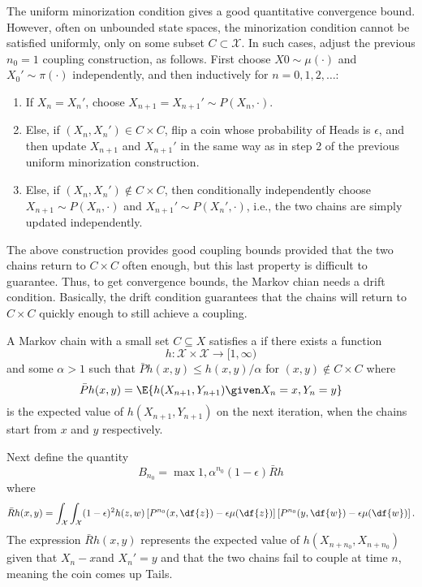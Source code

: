 \documentclass[12pt]{article}
\begin{document}
The uniform minorization condition gives a good quantitative convergence
bound.  However, often on unbounded state spaces, the minorization
condition cannot be satisfied uniformly, only on some subset \( C
\subset \mathcal{X} \).  In such cases, adjust the previous \( n_0 = 1 \)
coupling construction, as follows.  First choose \( X0 \sim \mu(\cdot) \)
and \( X_0' \sim \pi(\cdot) \) independently, and then inductively for \(
n = 0, 1, 2, \dots \):
\begin{enumerate}
    \item
        If \( X_n = X_n' \), choose \( X_{n+1} = X_{n+1}' \sim P(X_n,
        \cdot) \).
    \item
        Else, if \( (X_n , X_n') \in C \times C \), flip a coin whose
        probability of Heads is \( \epsilon \), and then update \( X_{n+1}
        \) and \( X_{n+1}' \) in the same way as in step 2 of the
        previous uniform minorization construction.
    \item
        Else, if \( (X_n, X_n' ) \notin C \times C \), then
        conditionally independently choose \( X_{n+1} \sim P(X_n, \cdot)
        \) and \( X_{n+1}' \sim P(X_n', \cdot) \), i.e., the two chains
        are simply updated independently.
\end{enumerate}

The above construction provides good coupling bounds provided that the
two chains return to \( C \times C \) often enough, but this last
property is difficult to guarantee.  Thus, to get convergence bounds,
the Markov chian needs a drift condition.  Basically, the drift
condition guarantees that the chains will return to \( C \times C \)
quickly enough to still achieve a coupling.

\begin{definition}
    A Markov chain with a small set \( C \subseteq X \) satisfies a
     if there exists a function
    \[
        h :  \mathcal{X} \times \mathcal{X} \to [1, \infty)
    \] and some \( \alpha > 1 \) such that \( \bar{P}h(x,y) \le h(x,y)/\alpha
    \) for \( (x,y) \notin C \times C \) where
    \[
        \bar{P}h(x,y)= \E{h(X_{n+1}, Y_{n+1}) \given X_n = x, Y_n = y}
    \] is the expected value of \( h(X_{n+1}, Y_{n+1}) \) on the next
    iteration, when the chains start from \( x \) and \( y \)
    respectively.
\end{definition}

Next define the quantity
\[
    B_{n_0} = \max{1, \alpha^{n_0}(1-\epsilon) \bar{R}h}
\] where
\[
    \bar{R}h(x,y) = \int_{\mathcal{X}} \int_{\mathcal{X}} (1-\epsilon)^2
    h(z,w) \left[ P^{n_0}(x, \df{z}) - \epsilon \mu(\df{z}) \right]
    \left[ P^{n_0}(y, \df{w}) - \epsilon \mu(\df{w}) \right].
\] The expression \( \bar{R}h(x,y) \) represents the expected value of \(
h(X_{n+{n_0}}, X_{n+{n_0}}) \) given that \( X_n - x \)and \( X_n' = y \)
and that the two chains fail to couple at time \( n \), meaning the coin
comes up Tails.
\end{document}
